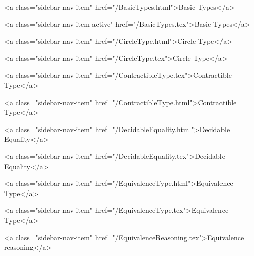           <a class="sidebar-nav-item" href="/BasicTypes.html">Basic Types</a>
        
      
    
      
        
          <a class="sidebar-nav-item active" href="/BasicTypes.tex">Basic Types</a>
        
      
    
      
        
          <a class="sidebar-nav-item" href="/CircleType.html">Circle Type</a>
        
      
    
      
        
          <a class="sidebar-nav-item" href="/CircleType.tex">Circle Type</a>
        
      
    
      
        
          <a class="sidebar-nav-item" href="/ContractibleType.tex">Contractible Type</a>
        
      
    
      
        
          <a class="sidebar-nav-item" href="/ContractibleType.html">Contractible Type</a>
        
      
    
      
        
          <a class="sidebar-nav-item" href="/DecidableEquality.html">Decidable Equality</a>
        
      
    
      
        
          <a class="sidebar-nav-item" href="/DecidableEquality.tex">Decidable Equality</a>
        
      
    
      
        
          <a class="sidebar-nav-item" href="/EquivalenceType.html">Equivalence Type</a>
        
      
    
      
        
          <a class="sidebar-nav-item" href="/EquivalenceType.tex">Equivalence Type</a>
        
      
    
      
        
          <a class="sidebar-nav-item" href="/EquivalenceReasoning.tex">Equivalence reasoning</a>
        
      
    
